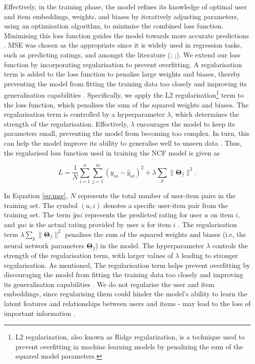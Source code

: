 Effectively, in the training phase, the model refines its knowledge of optimal user and item embeddings, weights, and biases by iteratively adjusting parameters, using an optimisation algorithm, to minimise the combined loss function. Minimising this loss function guides the model towards more accurate predictions \cite{abdi1999neural}. MSE was chosen as the appropriate since it is widely used in regression tasks, such as predicting ratings, and amongst the literature (\cite{abdi1999neural}; \cite{gurney2018introduction};\cite{paradarami2017hybrid}). We extend our loss function by incorporating regularisation to prevent overfitting. A regularisation term is added to the loss function to penalise large weights and biases, thereby preventing the model from fitting the training data too closely and improving its generalisation capabilities \cite{gurney2018introduction}. Specifically, we apply the L2 regularisation\footnote{L2 regularization, also known as Ridge regularization, is a technique used to prevent overfitting in machine learning models by penalizing the sum of the squared model parameters.} term to the loss function, which penalises the sum of the squared weights and biases. The regularisation term is controlled by a hyperparameter $\lambda$, which determines the strength of the regularisation. Effectively, $\lambda$ encourages the model to keep its parameters small, preventing the model from becoming too complex. In turn, this can help the model improve its ability to generalise well to unseen data \cite{gurney2018introduction}. Thus, the regularised loss function used in training the NCF model is given as


\begin{equation}
    \label{eq:mse}
    L = \frac{1}{N} \sum_{i=1}^{n} \sum_{j=1}^{m} (y_{ui} - \hat{y}_{ui})^2 + \lambda \sum_{p} \|\boldsymbol{\Theta}_f\|^2.
\end{equation}


In Equation \ref{eq:mse}, $N$ represents the total number of user-item pairs in the training set. The symbol $(u,i)$ denotes a specific user-item pair from the training set. The term $\hat{y}{ui}$ represents the predicted rating for user $u$ on item $i$, and $y{ui}$ is the actual rating provided by user $u$ for item $i$ \cite{he2017neural}. The regularisation term $\lambda \sum_{p} \|\boldsymbol{\Theta}_f\|^2$ penalises the sum of the squared weights and biases (i.e, the neural network parameters $\boldsymbol{\Theta}_f$) in the model. The hyperparameter $\lambda$ controls the strength of the regularisation term, with larger values of $\lambda$ leading to stronger regularisation. As mentioned, The regularisation term helps prevent overfitting by discouraging the model from fitting the training data too closely and improving its generalisation capabilities \cite{gurney2018introduction}. We do not regularise the user and item embeddings, since regularising them could hinder the model's ability to learn the latent features and relationships between users and items - may lead to the loss of important information \cite{he2017neural}. 


